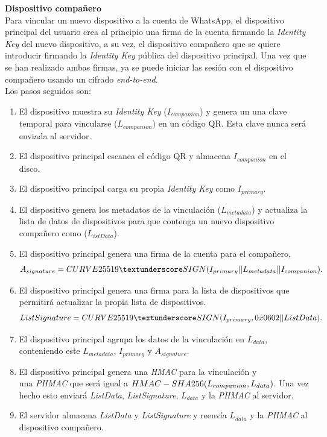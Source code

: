 \begin{description}
	\item \textbf{Dispositivo compañero}\\
	Para vincular un nuevo dispositivo a la cuenta de WhatsApp, el dispositivo principal del usuario crea al principio una firma de la cuenta firmando la \emph{Identity Key} del nuevo dispositivo, a su vez, el dispositivo compañero que se quiere introducir firmando la \emph{Identity Key} pública del dispositivo principal. Una vez que se han realizado ambas firmas, ya se puede iniciar las sesión con el dispositivo compañero usando un cifrado \emph{end-to-end}.\\Los pasos seguidos son:
	\begin{enumerate}
		\item El dispositivo muestra su \emph{Identity Key} ($I_{companion}$) y genera un una clave temporal para vincularse ($L_{companion}$) en un código QR. Esta clave nunca será enviada al servidor.
		\item El dispositivo principal escanea el código QR y almacena $I_{companion}$ en el disco.
		\item El dispositivo principal carga su propia \emph{Identity Key} como $I_{primary}$.
		\item El dispositivo genera los metadatos de la vinculación ($L_{metadata}$) y actualiza la lista de datos de dispositivos para que contenga un nuevo dispositivo compañero como ($L_{istData}$).
		\item El dispositivo principal genera una firma de la cuenta para el compañero, $$A_{signature}=CURVE25519\textunderscore SIGN(I_{primary} || L_{metadata} || I_{companion}).$$
		\item El dispositivo principal genera una firma para la lista de dispositivos que permitirá actualizar la propia lista de dispositivos. $$ListSignature = CURVE25519\textunderscore SIGN(I_{primary}, 0x0602 || ListData).$$
		\item El dispositivo principal agrupa los datos de la vinculación en $L_{data}$, conteniendo este $L_{metadata}$, $I_{primary}$ y $A_{signature}$.
		\item El dispositivo principal genera una \emph{HMAC} para la vinculación y\\ una \emph{PHMAC} que será igual a $HMAC-SHA256(L_{companion}\\, L_{data})$. Una vez hecho esto enviará \emph{ListData}, \emph{ListSignature}, $L_{data}$ y la \emph{PHMAC} al servidor.
		\item El servidor almacena \emph{ListData} y \emph{ListSignature} y reenvía $L_{data}$ y la \emph{PHMAC} al dispositivo compañero.

\end{enumerate}
\end{description}
